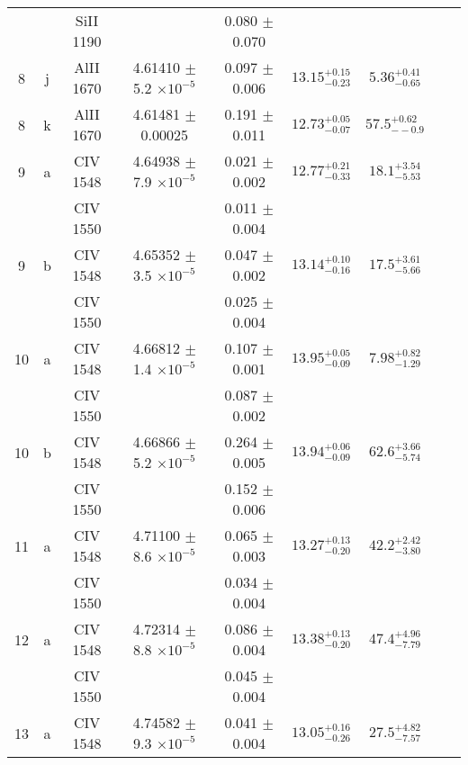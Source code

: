 \documentclass[12pt]{article}
\begin{document}
\begin{footnotesize}
\begin{longtable}{ c c c c c c c c c}
  &   & SiII     1190  &  &  0.080 $\pm$ 0.070   &   &     & 	 & \\ 
       8  & j  & AlII     1670  &  4.61410 $\pm$ 5.2 $\times 10^{-5}$   &  0.097 $\pm$ 0.006   & $13.15_{ - 0.23}^{ + 0.15}$  & $5.36_{ - 0.65}^{ + 0.41}$    & 	 & \\ 
       8  & k  & AlII     1670  &  4.61481 $\pm$ 0.00025  &  0.191 $\pm$ 0.011   & $12.73_{ - 0.07}^{ + 0.05}$  & $57.5_{ - -0.9}^{ + 0.62}$    & 	 & \\ 
       9  & a  & CIV     1548  &  4.64938 $\pm$ 7.9 $\times 10^{-5}$   &  0.021 $\pm$ 0.002   & $12.77_{ - 0.33}^{ + 0.21}$  & $18.1_{ - 5.53}^{ + 3.54}$    & 	 & \\ 
  &   & CIV     1550  &  &  0.011 $\pm$ 0.004   &   &     & 	 & \\ 
       9  & b  & CIV     1548  &  4.65352 $\pm$ 3.5 $\times 10^{-5}$   &  0.047 $\pm$ 0.002   & $13.14_{ - 0.16}^{ + 0.10}$  & $17.5_{ - 5.66}^{ + 3.61}$    & 	 & \\ 
  &   & CIV     1550  &  &  0.025 $\pm$ 0.004   &   &     & 	 & \\ 
      10  & a  & CIV     1548  &  4.66812 $\pm$ 1.4 $\times 10^{-5}$   &  0.107 $\pm$ 0.001   & $13.95_{ - 0.09}^{ + 0.05}$  & $7.98_{ - 1.29}^{ + 0.82}$    & 	 & \\ 
  &   & CIV     1550  &  &  0.087 $\pm$ 0.002   &   &     & 	 & \\ 
      10  & b  & CIV     1548  &  4.66866 $\pm$ 5.2 $\times 10^{-5}$   &  0.264 $\pm$ 0.005   & $13.94_{ - 0.09}^{ + 0.06}$  & $62.6_{ - 5.74}^{ + 3.66}$    & 	 & \\ 
  &   & CIV     1550  &  &  0.152 $\pm$ 0.006   &   &     & 	 & \\ 
      11  & a  & CIV     1548  &  4.71100 $\pm$ 8.6 $\times 10^{-5}$   &  0.065 $\pm$ 0.003   & $13.27_{ - 0.20}^{ + 0.13}$  & $42.2_{ - 3.80}^{ + 2.42}$    & 	 & \\ 
  &   & CIV     1550  &  &  0.034 $\pm$ 0.004   &   &     & 	 & \\ 
      12  & a  & CIV     1548  &  4.72314 $\pm$ 8.8 $\times 10^{-5}$   &  0.086 $\pm$ 0.004   & $13.38_{ - 0.20}^{ + 0.13}$  & $47.4_{ - 7.79}^{ + 4.96}$    & 	 & \\ 
  &   & CIV     1550  &  &  0.045 $\pm$ 0.004   &   &     & 	 & \\ 
      13  & a  & CIV     1548  &  4.74582 $\pm$ 9.3 $\times 10^{-5}$   &  0.041 $\pm$ 0.004   & $13.05_{ - 0.26}^{ + 0.16}$  & $27.5_{ - 7.57}^{ + 4.82}$    & 	 & \\ 

\end{longtable}
\end{footnotesize}
\end{document}
